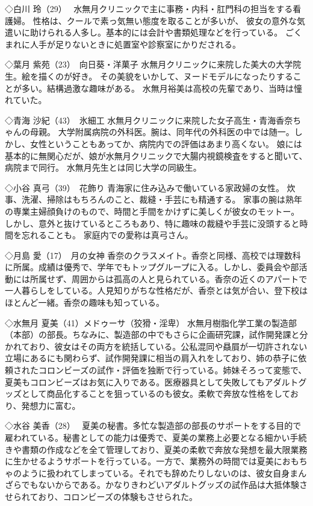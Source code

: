 ◇白川 玲（29）　
水無月クリニックで主に事務・内科・肛門科の担当をする看護婦。
性格は、クールで素っ気無い態度を取ることが多いが、
彼女の意外な気遣いに助けられる人多し。基本的には会計や書類処理などを行っている。
ごくまれに人手が足りないときに処置室や診察室にかりだされる。

◇葉月 紫苑（23）　向日葵・洋菓子
水無月クリニックに来院した美大の大学院生。絵を描くのが好き。
その美貌をいかして、ヌードモデルになったりすることが多い。結構過激な趣味がある。
水無月裕美は高校の先輩であり、当時は憧れていた。

◇青海 沙紀（43）　氷細工
水無月クリニックに来院した女子高生・青海香奈ちゃんの母親。
大学附属病院の外科医。腕は、同年代の外科医の中では随一。しかし、女性ということもあってか、病院内での評価はあまり高くない。
娘には基本的に無関心だが、娘が水無月クリニックで大腸内視鏡検査をすると聞いて、病院まで同行。
水無月先生とは同じ大学の同級生。

◇小谷 真弓（39）　花飾り
青海家に住み込みで働いている家政婦の女性。
炊事、洗濯、掃除はもちろんのこと、裁縫・手芸にも精通する。
家事の腕は熟年の専業主婦顔負けのもので、時間と手間をかけずに美しくが彼女のモットー。
しかし、意外と抜けているところもあり、特に趣味の裁縫や手芸に没頭すると時間を忘れることも。
家庭内での愛称は真弓さん。

◇月島 愛（17）　月の女神
香奈のクラスメイト。香奈と同様、高校では理数科に所属。成績は優秀で、学年でもトップグループに入る。しかし、委員会や部活動には所属せず、周囲からは孤高の人と見られている。香奈の近くのアパートで一人暮らしをしている。人見知りがちな性格だが、香奈とは気が合い、登下校はほとんど一緒。香奈の趣味も知っている。

◇水無月 夏美（41）メドゥーサ（狡猾・淫卑）
水無月樹脂化学工業の製造部（本部）の部長。ちなみに、製造部の中でもさらに企画研究課，試作開発課と分かれており、彼女はその両方を統括している。公私混同や贔屓が一切許されない立場にあるにも関わらず、試作開発課に相当の肩入れをしており、姉の恭子に依頼されたコロンビーズの試作・評価を独断で行っている。姉妹そろって変態で、夏美もコロンビーズはお気に入りである。医療器具として失敗してもアダルトグッズとして商品化することを狙っているのも彼女。柔軟で奔放な性格をしており、発想力に富む。

◇水谷 美香（28）　
夏美の秘書。多忙な製造部の部長のサポートをする目的で雇われている。秘書としての能力は優秀で、夏美の業務上必要となる細かい手続きや書類の作成などを全て管理しており、夏美の柔軟で奔放な発想を最大限業務に生かせるようサポートを行っている。一方で、業務外の時間では夏美におもちゃのように扱われてしまっている。それでも辞めたりしないのは、彼女自身まんざらでもないからである。かなりきわどいアダルトグッズの試作品は大抵体験させられており、コロンビーズの体験もさせられた。

